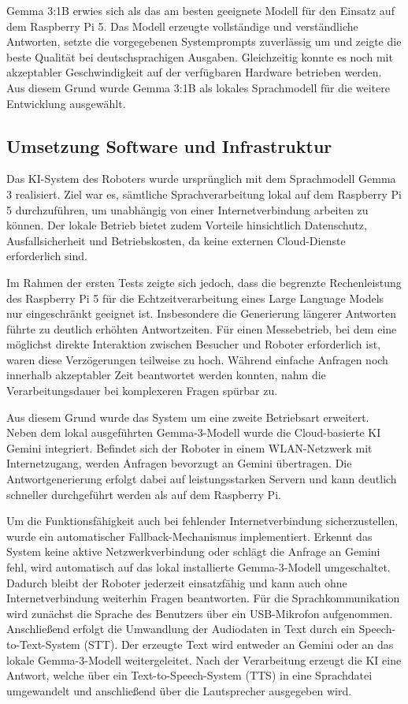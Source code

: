 Gemma 3:1B erwies sich als das am besten geeignete Modell für den Einsatz auf dem Raspberry Pi 5. Das Modell erzeugte vollständige und verständliche Antworten, setzte die vorgegebenen Systemprompts zuverlässig um und zeigte die beste Qualität bei deutschsprachigen Ausgaben. Gleichzeitig konnte es noch mit akzeptabler Geschwindigkeit auf der verfügbaren Hardware betrieben werden. Aus diesem Grund wurde Gemma 3:1B als lokales Sprachmodell für die weitere Entwicklung ausgewählt.

 
\subsection{Umsetzung Software und Infrastruktur}
Das KI-System des Roboters wurde ursprünglich mit dem Sprachmodell Gemma 3 realisiert. Ziel war es, sämtliche Sprachverarbeitung lokal auf dem Raspberry Pi 5 durchzuführen, um unabhängig von einer Internetverbindung arbeiten zu können. Der lokale Betrieb bietet zudem Vorteile hinsichtlich Datenschutz, Ausfallsicherheit und Betriebskosten, da keine externen Cloud-Dienste erforderlich sind.

Im Rahmen der ersten Tests zeigte sich jedoch, dass die begrenzte Rechenleistung des Raspberry Pi 5 für die Echtzeitverarbeitung eines Large Language Models nur eingeschränkt geeignet ist. Insbesondere die Generierung längerer Antworten führte zu deutlich erhöhten Antwortzeiten. Für einen Messebetrieb, bei dem eine möglichst direkte Interaktion zwischen Besucher und Roboter erforderlich ist, waren diese Verzögerungen teilweise zu hoch. Während einfache Anfragen noch innerhalb akzeptabler Zeit beantwortet werden konnten, nahm die Verarbeitungsdauer bei komplexeren Fragen spürbar zu.

Aus diesem Grund wurde das System um eine zweite Betriebsart erweitert. Neben dem lokal ausgeführten Gemma-3-Modell wurde die Cloud-basierte KI Gemini integriert. Befindet sich der Roboter in einem WLAN-Netzwerk mit Internetzugang, werden Anfragen bevorzugt an Gemini übertragen. Die Antwortgenerierung erfolgt dabei auf leistungsstarken Servern und kann deutlich schneller durchgeführt werden als auf dem Raspberry Pi.

Um die Funktionsfähigkeit auch bei fehlender Internetverbindung sicherzustellen, wurde ein automatischer Fallback-Mechanismus implementiert. Erkennt das System keine aktive Netzwerkverbindung oder schlägt die Anfrage an Gemini fehl, wird automatisch auf das lokal installierte Gemma-3-Modell umgeschaltet. Dadurch bleibt der Roboter jederzeit einsatzfähig und kann auch ohne Internetverbindung weiterhin Fragen beantworten.
Für die Sprachkommunikation wird zunächst die Sprache des Benutzers über ein USB-Mikrofon aufgenommen. Anschließend erfolgt die Umwandlung der Audiodaten in Text durch ein Speech-to-Text-System (STT). Der erzeugte Text wird entweder an Gemini oder an das lokale Gemma-3-Modell weitergeleitet. Nach der Verarbeitung erzeugt die KI eine Antwort, welche über ein Text-to-Speech-System (TTS) in eine Sprachdatei umgewandelt und anschließend über die Lautsprecher ausgegeben wird.

